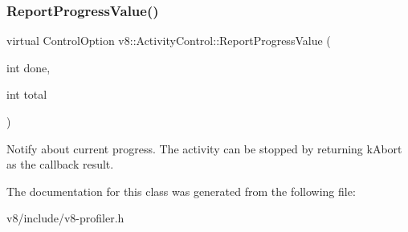 \subsubsection{\texorpdfstring{Report\+Progress\+Value()}{ReportProgressValue()}}
{\footnotesize\ttfamily virtual Control\+Option v8\+::\+Activity\+Control\+::\+Report\+Progress\+Value (\begin{DoxyParamCaption}\item[{int}]{done,  }\item[{int}]{total }\end{DoxyParamCaption})\hspace{0.3cm}{\ttfamily [pure virtual]}}

Notify about current progress. The activity can be stopped by returning k\+Abort as the callback result. 

The documentation for this class was generated from the following file\+:\begin{DoxyCompactItemize}
\item 
v8/include/v8-\/profiler.\+h\end{DoxyCompactItemize}
